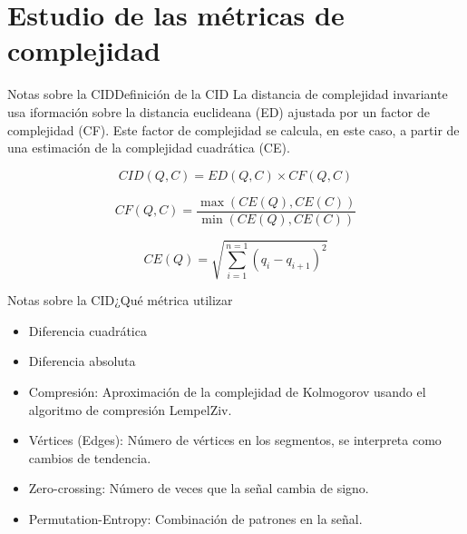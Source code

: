 \documentclass[12pt, aspectratio=169]{beamer} %
\begin{document}
\section{Estudio de las métricas de complejidad}

\begin{frame}{Notas sobre la CID}{Definición de la CID}
  La distancia de complejidad invariante usa iformación sobre la distancia euclideana (ED) ajustada por un factor de complejidad (CF).
  Este factor de complejidad se calcula, en este caso, a partir de una estimación de la complejidad cuadrática (CE). 

  \[ CID(Q,C) = ED(Q,C) \times CF(Q,C) \]

  \[ CF(Q,C) = \frac
    { \max{ (CE(Q),CE(C))} }
    { \min{(CE(Q),CE(C))}  }
  \]

  \[ CE(Q) = \sqrt{ \sum_{i=1}^{n=1}{  ( q_i - q_{i+1} )^2 } }  \]

\end{frame}

\begin{frame}{Notas sobre la CID}{¿Qué métrica utilizar}
  \begin{itemize}
  \item Diferencia cuadrática
  \item Diferencia absoluta
  \item Compresión: Aproximación de la complejidad de Kolmogorov usando el algoritmo de compresión LempelZiv.
  \item Vértices (Edges): Número de vértices en los segmentos, se interpreta como cambios de tendencia.
  \item Zero-crossing: Número de veces que la señal cambia de signo.
  \item Permutation-Entropy: Combinación de patrones en la señal.
  \end{itemize}
\end{frame}
\end{document}
